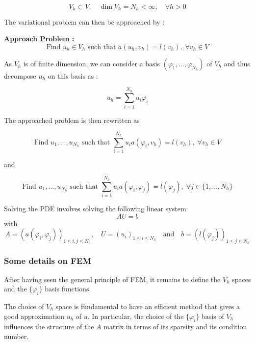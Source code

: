 \begin{equation*}
	V_h\subset V, \quad \dim V_h = N_h<\infty, \quad \forall h>0
\end{equation*}

The variational problem can then be approached by :

\textbf{Approach Problem :}
\begin{equation*}
	\text{Find } u_h\in V_h \text{ such that } a(u_h,v_h)=l(v_h), \;\forall v_h\in V
\end{equation*}

As $V_h$ is of finite dimension, we can consider a basis $(\varphi_1,\dots,\varphi_{N_h})$ of $V_h$ and thus decompose $u_h$ on this basis as :

\begin{equation}
	\label{decomp1}
	u_h=\sum_{i=1}^{N_h}u_i\varphi_i	
\end{equation}

The approached problem is then rewritten as

\begin{equation*}
	\text{Find } u_1,\dots,u_{N_h} \text{ such that } \sum_{i=1}^{N_h}u_i a(\varphi_i,v_h)=l(v_h), \;\forall v_h\in V 
\end{equation*}

and

\begin{equation*}
	\text{Find } u_1,\dots,u_{N_h} \text{ such that } \sum_{i=1}^{N_h}u_i a(\varphi_i,\varphi_j)=l(\varphi_j), \;\forall j\in \{1,\dots,N_h\}
\end{equation*}

Solving the PDE involves solving the following linear system:
\begin{equation*}
	AU=b
\end{equation*}
with
\begin{equation*}
	A=(a(\varphi_i,\varphi_j))_{1\le i,j\le N_h}, \quad U=(u_i)_{1\le i\le N_h} \quad \text{and} \quad b=(l(\varphi_j))_{1\le j\le N_h}
\end{equation*}

\subsubsection{Some details on FEM}

After having seen the general principle of FEM, it remains to define the $V_h$ spaces and the $\{\varphi_i\}$ basis functions.

\begin{Rem}
	The choice of $V_h$ space is fundamental to have an efficient method that gives a good approximation $u_h$ of $u$. In particular, the choice of the $\{\varphi_i\}$ basis of $V_h$ influences the structure of the $A$ matrix in terms of its sparsity and its condition number.
\end{Rem}

